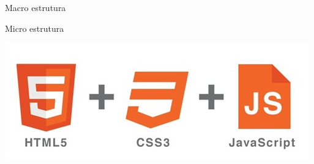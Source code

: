 \documentclass[11pt]{beamer}
\begin{document}
\begin{frame}{Macro estrutura}
  \begin{center}
  \end{center}
\end{frame}

\begin{frame}{Micro estrutura}
  \begin{center}
    \includegraphics[width=.8\textwidth]{../figures/html5-css3-javascript.jpg}
  \end{center}
\end{frame}
\end{document}
